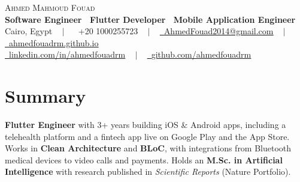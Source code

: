 \documentclass[letterpaper,11pt]{article}
\begin{document}
\begin{center}
    {\Huge \scshape Ahmed Mahmoud Fouad} \\ \vspace{3pt}
    {\large \textbf{Software Engineer \textbar\ Flutter Developer \textbar\ Mobile Application Engineer}} \\ \vspace{3pt}
    \small Cairo, Egypt ~ $|$ ~
    \raisebox{-0.1\height}\faPhone\ +20 1000255723 ~ $|$ ~ 
    \href{mailto:AhmedFouad2014@gmail.com}{\raisebox{-0.2\height}\faEnvelope\ \underline{AhmedFouad2014@gmail.com}} ~ $|$ ~
    \href{https://ahmedfouadrm.github.io}{\raisebox{-0.2\height}\faGlobe\ \underline{ahmedfouadrm.github.io}} \\ \vspace{2pt}
    \href{https://linkedin.com/in/ahmedfouadrm}{\raisebox{-0.2\height}\faLinkedin\ \underline{linkedin.com/in/ahmedfouadrm}} ~ $|$ ~
    \href{https://github.com/ahmedfouadrm}{\raisebox{-0.2\height}\faGithub\ \underline{github.com/ahmedfouadrm}}
    \vspace{-8pt}
\end{center}

\section{Summary}
\textbf{Flutter Engineer} with 3+ years building iOS \& Android apps, including a telehealth platform and a fintech app live on Google Play and the App Store. Works in \textbf{Clean Architecture} and \textbf{BLoC}, with integrations from Bluetooth medical devices to video calls and payments. Holds an \textbf{M.Sc. in Artificial Intelligence} with research published in \textit{Scientific Reports} (Nature Portfolio).

\end{document}
